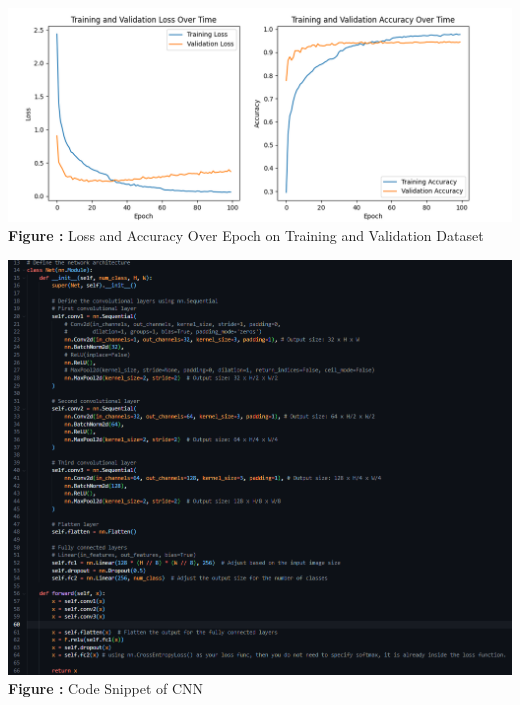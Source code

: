 \documentclass{article}
\begin{document}
\begin{minipage}{1\linewidth}
	\centering
	\hspace{0.12\linewidth} 
	\includegraphics[width=1\linewidth]{./Q6_1_2_res.png}  %
	\newline
	\textbf{Figure \thefigure:} Loss and Accuracy Over Epoch on Training and Validation Dataset %
	\label{fig:Q6_1_2_res}  %
\end{minipage}
\newline

\begin{minipage}{1\linewidth}
	\centering
	\hspace{0.12\linewidth} 
	\includegraphics[width=0.7\linewidth]{./Q6_1_2_cns.png}  %
	\newline
	\textbf{Figure \thefigure:} Code Snippet of CNN %
	\label{fig:Q6_1_2_cns}  %
\end{minipage}
\newline

	\newpage	
\end{document}
